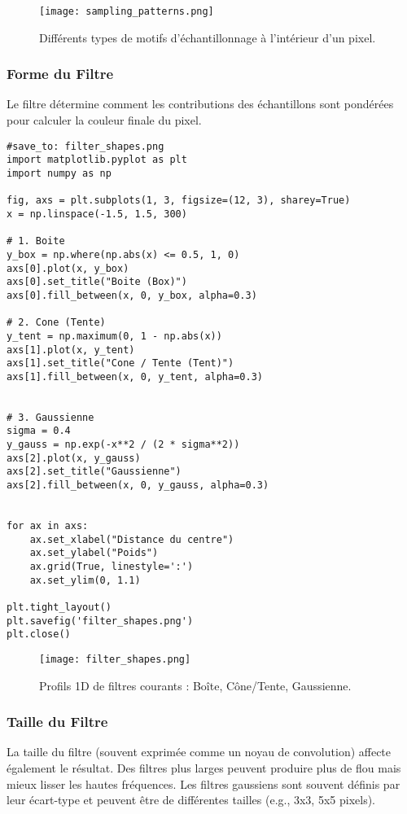 \documentclass{article}
\begin{document}
\begin{figure}[H]
\centering
\texttt{[image: sampling\_patterns.png]}
\caption{Différents types de motifs d'échantillonnage à l'intérieur d'un pixel.}
\label{fig:sampling_patterns}
\end{figure}

\subsubsection{Forme du Filtre}
Le filtre détermine comment les contributions des échantillons sont pondérées pour calculer la couleur finale du pixel.

\begin{verbatim}
#save_to: filter_shapes.png
import matplotlib.pyplot as plt
import numpy as np

fig, axs = plt.subplots(1, 3, figsize=(12, 3), sharey=True)
x = np.linspace(-1.5, 1.5, 300)

# 1. Boite
y_box = np.where(np.abs(x) <= 0.5, 1, 0)
axs[0].plot(x, y_box)
axs[0].set_title("Boite (Box)")
axs[0].fill_between(x, 0, y_box, alpha=0.3)

# 2. Cone (Tente)
y_tent = np.maximum(0, 1 - np.abs(x))
axs[1].plot(x, y_tent)
axs[1].set_title("Cone / Tente (Tent)")
axs[1].fill_between(x, 0, y_tent, alpha=0.3)


# 3. Gaussienne
sigma = 0.4
y_gauss = np.exp(-x**2 / (2 * sigma**2))
axs[2].plot(x, y_gauss)
axs[2].set_title("Gaussienne")
axs[2].fill_between(x, 0, y_gauss, alpha=0.3)


for ax in axs:
    ax.set_xlabel("Distance du centre")
    ax.set_ylabel("Poids")
    ax.grid(True, linestyle=':')
    ax.set_ylim(0, 1.1)

plt.tight_layout()
plt.savefig('filter_shapes.png')
plt.close()
\end{verbatim}

\begin{figure}[H]
\centering
\texttt{[image: filter\_shapes.png]}
\caption{Profils 1D de filtres courants : Boîte, Cône/Tente, Gaussienne.}
\label{fig:filter_shapes}
\end{figure}

\subsubsection{Taille du Filtre}
La taille du filtre (souvent exprimée comme un noyau de convolution) affecte également le résultat. Des filtres plus larges peuvent produire plus de flou mais mieux lisser les hautes fréquences. Les filtres gaussiens sont souvent définis par leur écart-type et peuvent être de différentes tailles (e.g., 3x3, 5x5 pixels).
\end{document}
